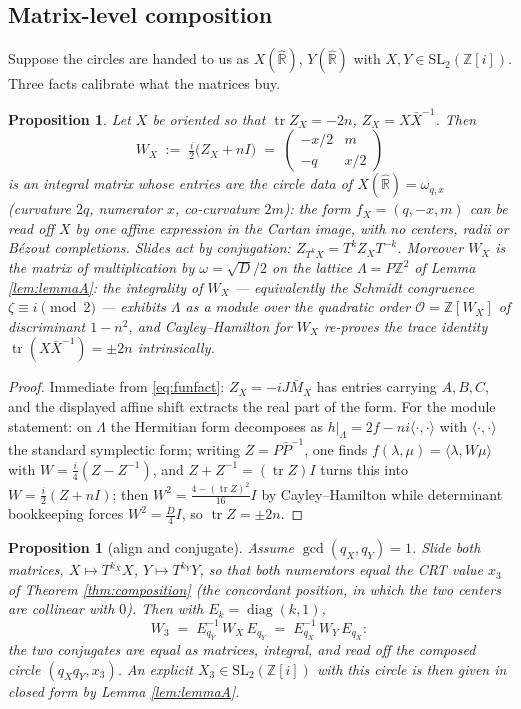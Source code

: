 \documentclass[11pt]{amsart}
\numberwithin{equation}{section}
\theoremstyle{plain}
\newtheorem{proposition}[theorem]{Proposition}
\theoremstyle{definition}
\theoremstyle{remark}
\newcommand{\R}{\mathbb{R}}
\newcommand{\Z}{\mathbb{Z}}
\newcommand{\Zi}{\Z[i]}
\newcommand{\Rhat}{\widehat{\R}}
\newcommand{\SL}{\mathrm{SL}}
\newcommand{\tr}{\operatorname{tr}}
\begin{document}
\subsection{Matrix-level composition}\label{subsec:matrixcomp}

Suppose the circles are handed to us as $X(\Rhat)$, $Y(\Rhat)$ with
$X, Y \in \SL_2(\Zi)$.  Three facts calibrate what the matrices buy.

\begin{proposition}\label{prop:WX}
Let $X$ be oriented so that $\tr Z_X = -2n$, $Z_X = X\bar X^{-1}$.
Then
\[
  W_X \;:=\; \tfrac{i}{2}\bigl(Z_X + nI\bigr)
  \;=\; \begin{pmatrix} -x/2 & m \\ -q & x/2 \end{pmatrix}
\]
is an integral matrix whose entries are the circle data of
$X(\Rhat) = \omega_{q,x}$ (curvature $2q$, numerator $x$, co-curvature
$2m$): the form $f_X = (q, -x, m)$ can be read off $X$ by one affine
expression in the Cartan image, with no centers, radii or B\'ezout
completions.  Slides act by conjugation: $Z_{T^kX} = T^kZ_XT^{-k}$.
Moreover $W_X$ is the matrix of multiplication by $\omega = \sqrt D/2$
on the lattice $\Lambda = P\Z^2$ of Lemma \ref{lem:lemmaA}: the
integrality of $W_X$ --- equivalently the Schmidt congruence
$\zeta \equiv i \pmod 2$ --- exhibits $\Lambda$ as a module over the
quadratic order $\mathcal{O} = \Z[W_X]$ of discriminant $1 - n^2$, and
Cayley--Hamilton for $W_X$ re-proves the trace identity
$\tr(X\bar X^{-1}) = \pm 2n$ intrinsically.
\end{proposition}

\begin{proof}
Immediate from \eqref{eq:funfact}: $Z_X = -iJ\bar M_X$ has entries
carrying $A, B, C$, and the displayed affine shift extracts the real
part of the form.  For the module statement: on $\Lambda$ the Hermitian
form decomposes as $h|_\Lambda = 2f - ni\langle\cdot,\cdot\rangle$ with
$\langle\cdot,\cdot\rangle$ the standard symplectic form; writing
$Z = P\bar P^{-1}$, one finds $f(\lambda, \mu) = \langle \lambda,
W\mu\rangle$ with $W = \tfrac i4(Z - Z^{-1})$, and
$Z + Z^{-1} = (\tr Z)I$ turns this into $W = \tfrac i2(Z + nI)$; then
$W^2 = \tfrac{4 - (\tr Z)^2}{16}I$ by Cayley--Hamilton while
determinant bookkeeping forces $W^2 = \tfrac D4 I$, so
$\tr Z = \pm 2n$.
\end{proof}

\begin{proposition}[align and conjugate]
\label{prop:aligncompose}
Assume $\gcd(q_X, q_Y) = 1$.  Slide both matrices, $X \mapsto
T^{k_X}X$, $Y \mapsto T^{k_Y}Y$, so that both numerators equal the CRT
value $x_3$ of Theorem \ref{thm:composition} (the concordant position,
in which the two centers are collinear with $0$).  Then with
$E_k = \operatorname{diag}(k, 1)$,
\[
  W_3 \;=\; E_{q_Y}^{-1}\,W_X\,E_{q_Y} \;=\; E_{q_X}^{-1}\,W_Y\,E_{q_X}:
\]
the two conjugates are equal as matrices, integral, and read off the
composed circle $(q_Xq_Y, x_3)$.  An explicit $X_3 \in \SL_2(\Zi)$ with
this circle is then given in closed form by Lemma \ref{lem:lemmaA}.
\end{proposition}
\end{document}
